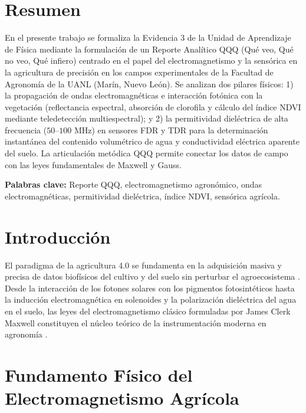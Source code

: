 \documentclass[spanish,letterpaper,oneside]{article}
\begin{document}
\hypersetup{pageanchor=false}
\begingroup
\fontsize{14}{17}\selectfont
\renewcommand{\Huge}{\fontsize{14}{17}\selectfont\bfseries}
\renewcommand{\large}{\fontsize{14}{17}\selectfont}
\templatePortrait
\clearpage
\endgroup
\hypersetup{pageanchor=true}
\templatePagecfg
\singlespacing
\setlength{\tabcolsep}{8pt}
\renewcommand{\arraystretch}{1.18}

\section*{Resumen}
En el presente trabajo se formaliza la Evidencia 3 de la Unidad de Aprendizaje de Física mediante la formulación de un Reporte Analítico QQQ (Qué veo, Qué no veo, Qué infiero) centrado en el papel del electromagnetismo y la sensórica en la agricultura de precisión en los campos experimentales de la Facultad de Agronomía de la UANL (Marín, Nuevo León). Se analizan dos pilares físicos: 1) la propagación de ondas electromagnéticas e interacción fotónica con la vegetación (reflectancia espectral, absorción de clorofila y cálculo del índice NDVI mediante teledetección multiespectral); y 2) la permitividad dieléctrica de alta frecuencia ($50\text{--}100\text{ MHz}$) en sensores FDR y TDR para la determinación instantánea del contenido volumétrico de agua y conductividad eléctrica aparente del suelo. La articulación metódica QQQ permite conectar los datos de campo con las leyes fundamentales de Maxwell y Gauss.

\vspace{0.4cm}
\noindent\textbf{Palabras clave:} Reporte QQQ, electromagnetismo agronómico, ondas electromagnéticas, permitividad dieléctrica, índice NDVI, sensórica agrícola.

\section{Introducción}
El paradigma de la agricultura 4.0 se fundamenta en la adquisición masiva y precisa de datos biofísicos del cultivo y del suelo sin perturbar el agroecosistema \parencite{giancoli2008}. Desde la interacción de los fotones solares con los pigmentos fotosintéticos hasta la inducción electromagnética en solenoides y la polarización dieléctrica del agua en el suelo, las leyes del electromagnetismo clásico formuladas por James Clerk Maxwell constituyen el núcleo teórico de la instrumentación moderna en agronomía \parencite{serway2018,tipler2010}.

\section{Fundamento Físico del Electromagnetismo Agrícola}
\end{document}
